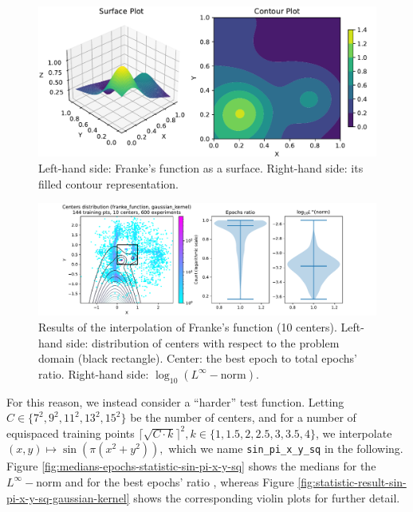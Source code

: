 \documentclass[12pt]{report} %
\begin{document}
\begin{figure}[ht]
  \includegraphics[width=.8\textwidth]{imagenes/experiments/2d/franke_interpolation/Franke_Function_Surface_Contour.pdf}
  \caption{Left-hand side: Franke's function as a surface. Right-hand side:
    its filled contour representation.}
  \label{fig:franke-function-surface-contour}
\end{figure}


\begin{figure}[h]
  \includegraphics[width=\textwidth, trim={2cm 0 2.8cm 0}, clip=true]{imagenes/experiments/2d/franke_interpolation/tr12_c10_franke_function_gaussian_kernel.pdf}
  \caption{Results of the interpolation of Franke's function (10 centers).
    Left-hand side: distribution of centers with respect to the problem domain (black rectangle). Center: the best epoch to total epochs' ratio.
    Right-hand side: $\log_{10}(L^\infty-\text{norm})$.}
  \label{fig:franke-tr12-c10}
\end{figure}

For this reason, we instead consider a ``harder'' test function. Letting $C\in\{7^2,9^2,11^2,13^2,15^2\}$ be the number of centers, and for a number of equispaced training points $ \lceil \sqrt{C \cdot k} \rceil^2, k \in \{1,1.5,2,2.5,3,3.5,4\}$, we interpolate $(x,y)\mapsto \sin(\pi(x^2+y^2)),$ which we name \texttt{sin\_pi\_x\_y\_sq} in the following. Figure \ref{fig:medians-epochs-statistic-sin-pi-x-y-sq} shows the medians for the $L^\infty-$norm and for the best epochs' ratio
, whereas Figure \ref{fig:statistic-result-sin-pi-x-y-sq-gaussian-kernel} shows the corresponding violin plots for further detail. 
\end{document}
